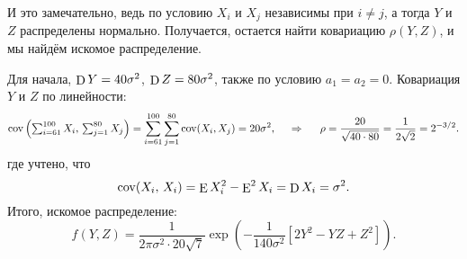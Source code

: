 И это замечательно, ведь по условию $X_i$ и $X_j$ независимы при $i \neq j$, а тогда $Y$ и $Z$ распределены нормально. Получается, остается найти ковариацию $\rho(Y, Z)$, и мы найдём искомое распределение.

Для начала, $\mathop{\mathrm{D}}\nolimits Y = 40 \sigma^2$, $\mathop{\mathrm{D}}\nolimits Z = 80 \sigma^2$, также по условию $a_1 = a_2 = 0$. Ковариация $Y$ и $Z$ по линейности:
\begin{equation*}
    \mathop{\mathrm{cov}}\nolimits \left(\textstyle \sum_{i=61}^{100} X_i,\, \textstyle \sum_{j=1}^{80} X_j\right) = 
    \sum_{i=61}^{100} \sum_{j=1}^{80} \mathop{\mathrm{cov}}\nolimits(X_i, X_j) = 20 \sigma^2,
    \hspace{0.5cm} \Rightarrow \hspace{0.5cm}
    \rho = \frac{20}{\sqrt{40 \cdot 80}} = \frac{1}{2\sqrt{2}} = 2^{-3/2}.
\end{equation*}
где учтено, что
\begin{equation*}
    \mathop{\mathrm{cov}}\nolimits(X_i,\, X_i) = \mathop{\mathrm{E}}\nolimits X_i^2 - \mathop{\mathrm{E}}\nolimits^2 X_i = \mathop{\mathrm{D}}\nolimits X_i = \sigma^2.
\end{equation*}
Итого, искомое распределение:
\begin{equation*}
    f(Y, Z) = \frac{1}{2\pi \sigma^2 \cdot 20 \sqrt{7}} \exp\left(
        - \frac{1}{140 \sigma^2} \left[
            2 Y^2 -  Y Z +  Z^2
        \right]
    \right).
\end{equation*}
